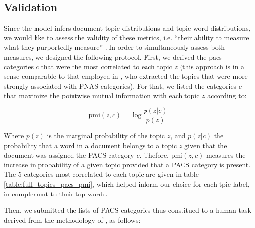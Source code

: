\documentclass[smallextended]{svjour3}
\begin{document}
\subsection{Validation}
\label{appendix:validation}

Since the model infers document-topic distributions and topic-word distributions, we would like to assess the validity of these metrics, i.e. ``their ability to measure what they purportedly measure'' \citep[p.~3240]{Bannigan2009}. In order to simultaneously assess both measures, we designed the following protocol. First, we derived the \gls{pacs} categories $c$ that were the most correlated to each topic $z$ (this approach is in a sense comparable to that employed in \citealt{Griffiths2004}, who extracted the topics that were more strongly associated with PNAS categories). For that, we listed the categories $c$ that maximize the pointwise mutual information with each topic $z$ according to:

\begin{equation}
    \label{eq:pmi_expression}
    \mathrm{pmi}(z,c) = \log \dfrac{p(z|c)}{p(z)}%
\end{equation}

Where $p(z)$ is the marginal probability of the topic $z$, and $p(z|c)$ the probability that a word in a document belongs to a topic $z$ given that the document was assigned the PACS category $c$. Thefore, $\mathrm{pmi}(z,c)$ measures the increase in probability of a given topic provided that a PACS category is present. The 5 categories most correlated to each topic are given in table \ref{table:full_topics_pacs_pmi}, which helped inform our choice for each tpic label, in complement to their top-words.

Then, we submitted the lists of PACS categories thus constitued to a human task derived from the methodology of \citet{Bennett2021}, as follows:
\end{document}
